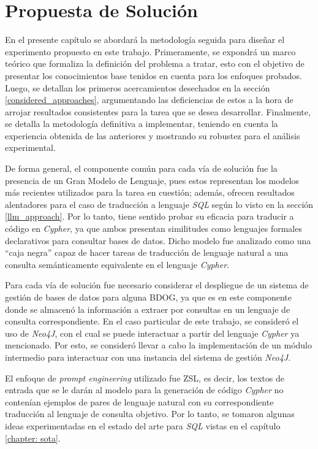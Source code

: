 \chapter{Propuesta de Solución}\label{chapter: proposedsolution}

En el presente capítulo se abordará la metodología seguida para diseñar el experimento propuesto en este trabajo. Primeramente, se expondrá un marco teórico que formaliza la definición del problema a tratar, esto con el objetivo de presentar los conocimientos base tenidos en cuenta para los enfoques probados. Luego, se detallan los primeros acercamientos desechados en la sección \ref{considered_approaches}, argumentando las deficiencias de estos a la hora de arrojar resultados consistentes para la tarea que se desea desarrollar. Finalmente, se detalla la metodología definitiva a implementar, teniendo en cuenta la experiencia obtenida de las anteriores y mostrando su robustez para el análisis experimental.

De forma general, el componente común para cada vía de solución fue la presencia de un Gran Modelo de Lenguaje, pues estos representan los modelos más recientes utilizados para la tarea en cuestión; además, ofrecen resultados alentadores para el caso de traducción a lenguaje \textit{SQL} según lo visto en la sección \ref{llm_approach}. Por lo tanto, tiene sentido probar su eficacia para traducir a código en \textit{Cypher}, ya que ambos presentan similitudes como lenguajes formales declarativos para consultar bases de datos. Dicho modelo fue analizado como una ``caja negra'' capaz de hacer tareas de traducción de lenguaje natural a una consulta semánticamente equivalente en el lenguaje \textit{Cypher}.

Para cada vía de solución fue necesario considerar el despliegue de un sistema de gestión de bases de datos para alguna BDOG, ya que es en este componente donde se almacenó la información a extraer por consultas en un lenguaje de consulta correspondiente. En el caso particular de este trabajo, se consideró el uso de \textit{Neo4J}, con el cual se puede interactuar a partir del lenguaje \textit{Cypher} ya mencionado. Por esto, se consideró llevar a cabo la implementación de un módulo intermedio para interactuar con una instancia del sistema de gestión \textit{Neo4J}.

El enfoque de \textit{prompt engineering} utilizado fue ZSL, es decir, los textos de entrada que se le darán al modelo para la generación de código \textit{Cypher} no contenían ejemplos de pares de lenguaje natural con su correspondiente traducción al lenguaje de consulta objetivo. Por lo tanto, se tomaron algunas ideas experimentadas en el estado del arte para \textit{SQL} vistas en el capítulo \ref{chapter: sota}.

